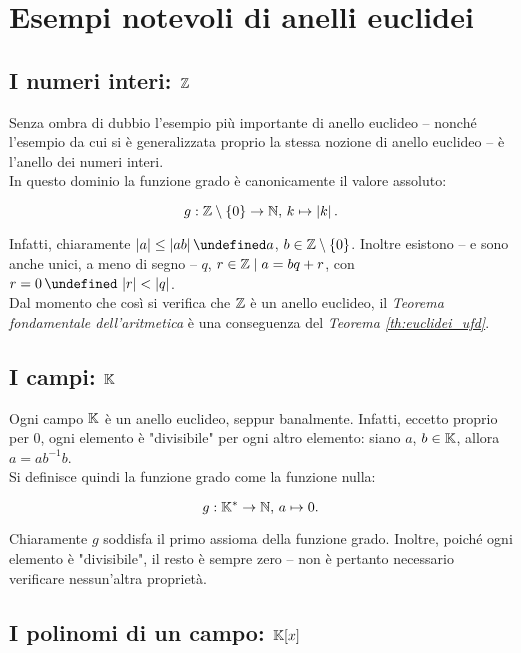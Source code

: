 \documentclass[a4paper]{article}
\let\oldforall\forall
\let\forall\undefined
\DeclareMathOperator{\forall}{\oldforall}
\let\oldlor\lor
\let\lor\undefined
\DeclareMathOperator{\lor}{\oldlor}
\begin{document}
\section{Esempi notevoli di anelli euclidei}

\subsection{I numeri interi: $\mathbb{Z}$}

Senza ombra di dubbio l'esempio più importante di anello euclideo -- nonché
l'esempio da cui si è generalizzata proprio la stessa nozione di anello
euclideo -- è l'anello dei numeri interi. \\

In questo dominio la funzione grado è canonicamente il valore assoluto:

\[g : \mathbb{Z} \setminus \{0\} \to \mathbb{N}, \, k \mapsto \left|k\right|.\]

\vskip 0.1in

Infatti, chiaramente $|a| \leq |ab|\, \forall a$, $b \in \mathbb{Z} \setminus \{0\}$. Inoltre
esistono -- e sono anche unici, a meno di segno -- $q$, $r \in \mathbb{Z} \mid a = bq + r$, con $r=0 \,\lor\,
    \left|r\right| < \left|q\right|$. \\

Dal momento che così si verifica che $\mathbb{Z}$ è un anello euclideo, il \textit{Teorema
    fondamentale dell'aritmetica} è una conseguenza del
\textit{Teorema \ref{th:euclidei_ufd}}.

\subsection{I campi: $\mathbb{K}$}

Ogni campo $\mathbb{K}$ è un anello euclideo, seppur banalmente. Infatti, eccetto proprio
per $0$, ogni elemento è "divisibile" per ogni altro elemento: siano $a$, $b \in \mathbb{K}$,
allora $a = ab^{-1}b$. \\

Si definisce quindi la funzione grado come la funzione nulla:

\[g : \mathbb{K}^* \to \mathbb{N}, \, a \mapsto 0.\]

\vskip 0.1in

Chiaramente $g$ soddisfa il primo assioma della funzione grado. Inoltre,
poiché ogni elemento è "divisibile", il resto è sempre zero -- non è pertanto
necessario verificare nessun'altra proprietà.

\subsection{I polinomi di un campo: $\mathbb{K}[x]$}
\end{document}
